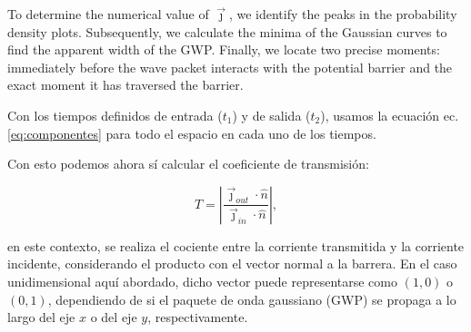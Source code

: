     To determine the numerical value of $\vec{\jmath}$, we identify the peaks in the probability density plots.
    Subsequently, we calculate the minima of the Gaussian curves to find the apparent width of the GWP. Finally, we locate two precise moments: immediately before the wave packet interacts with the potential barrier and the exact moment it has traversed the barrier.

    Con los tiempos definidos de entrada ($t_1$) y de salida ($t_2$), usamos la ecuación ec.\eqref{eq:componentes} para todo el espacio en cada uno de los tiempos. 
    
    Con esto podemos ahora sí calcular el coeficiente de transmisión:
    
    \begin{equation}
        \label{eq:transmissionCoef}
        T = \left| \frac{\vec{\jmath}_{out}\cdot\hat{n}}{\vec{\jmath}_{in}\cdot\hat{n}} \right|,
    \end{equation}

    \noindent en este contexto, se realiza el cociente entre la corriente transmitida y la corriente incidente, considerando el producto con el vector normal a la barrera.
    En el caso unidimensional aquí abordado, dicho vector puede representarse como $(1,0)$ o $(0,1)$, dependiendo de si el paquete de onda gaussiano (GWP) se propaga a lo largo del eje $x$ o del eje $y$, respectivamente.
